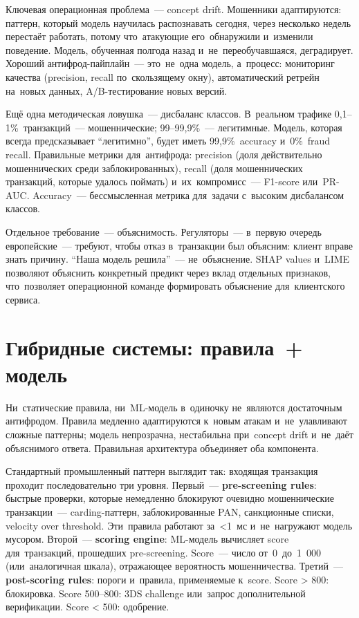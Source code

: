 Ключевая операционная проблема~--- concept drift. Мошенники
адаптируются: паттерн, который модель научилась распознавать сегодня,
через несколько недель перестаёт работать, потому что~атакующие его~обнаружили
и~изменили поведение. Модель, обученная полгода назад и~не~переобучавшаяся,
деградирует. Хороший антифрод-пайплайн~--- это~не~одна модель, а~процесс:
мониторинг качества (precision, recall по~скользящему окну), автоматический
ретрейн на~новых данных, A/B-тестирование новых версий.

Ещё одна методическая ловушка~--- дисбаланс классов. В~реальном трафике 0,1--1\%~транзакций~---
мошеннические; 99--99,9\%~--- легитимные. Модель, которая всегда предсказывает
\enquote{легитимно}, будет иметь 99,9\%~accuracy и~0\%~fraud recall.
Правильные метрики для~антифрода: precision (доля действительно мошеннических
среди заблокированных), recall (доля мошеннических транзакций, которые
удалось поймать) и~их~компромисс~--- F1-score или~PR-AUC. Accuracy~---
бессмысленная метрика для~задачи с~высоким дисбалансом классов.

Отдельное требование~--- объяснимость. Регуляторы~--- в~первую очередь европейские~---
требуют, чтобы отказ в~транзакции был объясним: клиент вправе знать
причину. \enquote{Наша модель решила}~--- не~объяснение. SHAP values
и~LIME позволяют объяснить конкретный предикт через вклад отдельных
признаков, что~позволяет операционной команде формировать объяснение
для~клиентского сервиса.


\section{Гибридные системы: правила~+ модель}
\label{sec:fraud-hybrid}

Ни~статические правила, ни~ML-модель в~одиночку не~являются достаточным
антифродом. Правила медленно адаптируются к~новым атакам и~не~улавливают
сложные паттерны; модель непрозрачна, нестабильна при~concept drift
и~не~даёт объяснимого ответа. Правильная архитектура объединяет оба
компонента.

Стандартный промышленный паттерн выглядит так: входящая транзакция
проходит последовательно три уровня. Первый~---
\textbf{pre-screening rules}: быстрые проверки, которые немедленно
блокируют очевидно мошеннические транзакции~--- carding-паттерн,
заблокированные PAN, санкционные списки, velocity over threshold.
Эти~правила работают за~<1~мс и~не~нагружают модель мусором. Второй~---
\textbf{scoring engine}: ML-модель вычисляет score для~транзакций,
прошедших pre-screening. Score~--- число от~0~до~1~000 (или~аналогичная
шкала), отражающее вероятность мошенничества. Третий~---
\textbf{post-scoring rules}: пороги и~правила, применяемые к~score.
Score > 800: блокировка. Score 500--800: 3DS challenge или~запрос
дополнительной верификации. Score < 500: одобрение.

